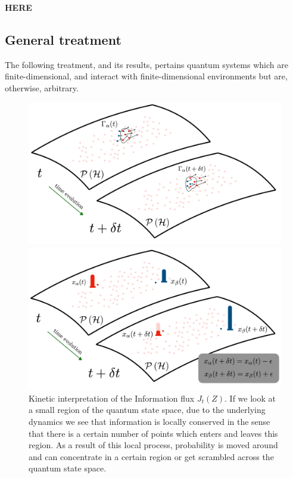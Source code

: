 \documentclass[draft,nofootinbib,pre,twocolumn,showpacs,showkeys,preprintnumbers,floatfix]{revtex4-1}
\newcommand{\1}{\mathbbm{1}}
\begin{document}
{\bf HERE}\\
\subsection*{General treatment}
The following treatment, and its results, pertains quantum systems which are finite-dimensional, 
and interact with finite-dimensional environments but are, otherwise, arbitrary. 
\begin{figure}[t!]
\centering
\begin{minipage}[t]{.45\textwidth}
\includegraphics[width=\textwidth]{./img/Flux.pdf}
\caption{Kinetic interpretation of the Information flux $J_t(Z)$. If we look at a small region of the 
	quantum state space,  due to the underlying dynamics we see that information is locally conserved 
	in the sense that there is a certain number of points which enters and leaves this region. As a 
	result of this local process, probability is moved around and can concentrate in a certain region 
	or get scrambled across the quantum state space.
	}
\label{fig:flux_term}
\end{minipage}\hfill
\begin{minipage}[t]{.45\textwidth}
\includegraphics[width=\textwidth]{./img/Source.pdf}

\end{minipage}
\end{figure}
\end{document}
